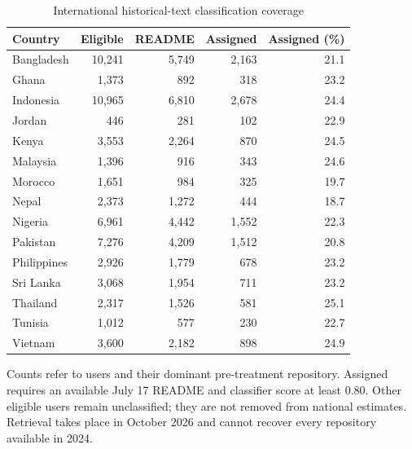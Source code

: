 \begin{table}[H]
\centering
\small
\caption{International historical-text classification coverage}
\label{tab:sector_coverage}
\begin{threeparttable}
\begin{tabular}{@{}lrrrr@{}}
\toprule
Country & Eligible & README & Assigned & Assigned (\%) \\
\midrule
Bangladesh & 10,241 & 5,749 & 2,163 & 21.1 \\
Ghana & 1,373 & 892 & 318 & 23.2 \\
Indonesia & 10,965 & 6,810 & 2,678 & 24.4 \\
Jordan & 446 & 281 & 102 & 22.9 \\
Kenya & 3,553 & 2,264 & 870 & 24.5 \\
Malaysia & 1,396 & 916 & 343 & 24.6 \\
Morocco & 1,651 & 984 & 325 & 19.7 \\
Nepal & 2,373 & 1,272 & 444 & 18.7 \\
Nigeria & 6,961 & 4,442 & 1,552 & 22.3 \\
Pakistan & 7,276 & 4,209 & 1,512 & 20.8 \\
Philippines & 2,926 & 1,779 & 678 & 23.2 \\
Sri Lanka & 3,068 & 1,954 & 711 & 23.2 \\
Thailand & 2,317 & 1,526 & 581 & 25.1 \\
Tunisia & 1,012 & 577 & 230 & 22.7 \\
Vietnam & 3,600 & 2,182 & 898 & 24.9 \\
\bottomrule
\end{tabular}
\begin{tablenotes}[flushleft]
\footnotesize
\item Counts refer to users and their dominant pre-treatment repository. Assigned requires an available July 17 README and classifier score at least 0.80. Other eligible users remain unclassified; they are not removed from national estimates. Retrieval takes place in October 2026 and cannot recover every repository available in 2024.
\end{tablenotes}
\end{threeparttable}
\end{table}
